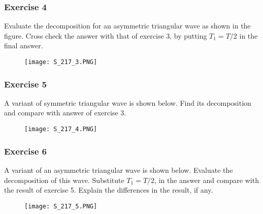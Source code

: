 \subsubsection{Exercise 4}
\noindent
Evaluate the decomposition for an asymmetric triangular wave as shown in the figure. Cross check the answer with that of exercise 3, by putting  $T_1 = T/2$ in the final answer.
\begin{figure}[ht]
\centering
\texttt{[image: S\_217\_3.PNG]}
\end{figure}


\subsubsection{Exercise 5}
\noindent
A variant of symmetric triangular wave is shown below. Find its decomposition and compare with answer of exercise 3.
\begin{figure}[ht]
\centering
\texttt{[image: S\_217\_4.PNG]}
\end{figure}

\pagebreak

\subsubsection{Exercise 6}
\noindent
A variant of an asymmetric triangular wave is shown below. Evaluate the decomposition of  this wave. Substitute $T_1 = T/2$, in the answer and compare with the result of exercise 5. Explain the differences in the result, if any.
\begin{figure}[ht]
\centering
\texttt{[image: S\_217\_5.PNG]}
\end{figure}








                



                     

